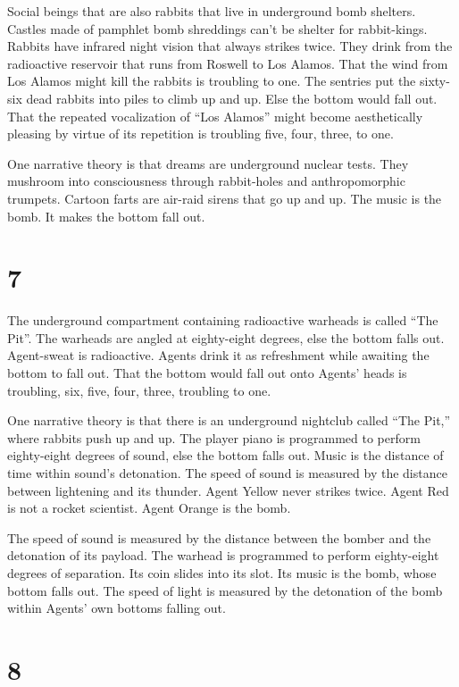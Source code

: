 \documentclass[
]{memoir}
\begin{document}
Social beings that are also rabbits that live in underground bomb
shelters. Castles made of pamphlet bomb shreddings can't be shelter for
rabbit-kings. Rabbits have infrared night vision that always strikes
twice. They drink from the radioactive reservoir that runs from Roswell
to Los Alamos. That the wind from Los Alamos might kill the rabbits is
troubling to one. The sentries put the sixty-six dead rabbits into piles
to climb up and up. Else the bottom would fall out. That the repeated
vocalization of ``Los Alamos'' might become aesthetically pleasing by
virtue of its repetition is troubling five, four, three, to one.

One narrative theory is that dreams are underground nuclear tests. They
mushroom into consciousness through rabbit-holes and anthropomorphic
trumpets. Cartoon farts are air-raid sirens that go up and up. The music
is the bomb. It makes the bottom fall out.

\hypertarget{section-8}{%
\section*{7}\label{section-8}}

The underground compartment containing radioactive warheads is called
``The Pit''. The warheads are angled at eighty-eight degrees, else the
bottom falls out. Agent-sweat is radioactive. Agents drink it as
refreshment while awaiting the bottom to fall out. That the bottom would
fall out onto Agents' heads is troubling, six, five, four, three,
troubling to one.

One narrative theory is that there is an underground nightclub called
``The Pit,'' where rabbits push up and up. The player piano is
programmed to perform eighty-eight degrees of sound, else the bottom
falls out. Music is the distance of time within sound's detonation. The
speed of sound is measured by the distance between lightening and its
thunder. Agent Yellow never strikes twice. Agent Red is not a rocket
scientist. Agent Orange is the bomb.

The speed of sound is measured by the distance between the bomber and
the detonation of its payload. The warhead is programmed to perform
eighty-eight degrees of separation. Its coin slides into its slot. Its
music is the bomb, whose bottom falls out. The speed of light is
measured by the detonation of the bomb within Agents' own bottoms
falling out.

\hypertarget{section-9}{%
\section*{8}\label{section-9}}
\end{document}
